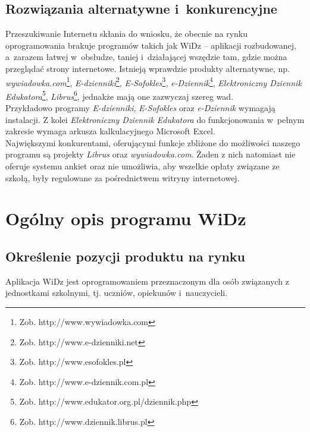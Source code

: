 \documentclass[12pt,leqno,twoside]{mwart}
\begin{document}
\subsection{Rozwiązania alternatywne i~konkurencyjne}
\noindent Przeszukiwanie Internetu skłania do wniosku, że obecnie na rynku oprogramowania brakuje programów takich jak WiDz – aplikacji rozbudowanej, a~zarazem łatwej w~obsłudze, taniej i~działającej wszędzie tam, gdzie można przeglądać strony internetowe. Istnieją wprawdzie produkty alternatywne, np. \textit{wywiadowka.com}\footnote{Zob. http://www.wywiadowka.com}, \textit{E-dzienniki}\footnote{Zob. http://www.e-dzienniki.net}, \textit{E-Sofokles}\footnote{Zob. http://www.esofokles.pl}, \textit{e-Dziennik}\footnote{Zob. http://www.e-dziennik.com.pl}, \textit{Elektroniczny Dziennik Edukatora}\footnote{Zob. http://www.edukator.org.pl/dziennik.php}, \textit{Librus}\footnote{Zob. http://www.dziennik.librus.pl}, jednakże mają one zazwyczaj szereg wad.\\
\indent Przykładowo programy \textit{E-dzienniki}, \textit{E-Sofokles} oraz \textit{e-Dziennik} wymagają instalacji. Z kolei \textit{Elektroniczny Dziennik Edukatora} do funkcjonowania w~pełnym zakresie wymaga arkusza kalkulacyjnego Microsoft Excel.\\
\indent Największymi konkurentami, oferującymi funkcje zbliżone do możliwości naszego programu są projekty \textit{Librus} oraz \textit{wywiadowka.com}. Żaden z nich natomiast nie oferuje systemu ankiet oraz nie umożliwia, aby  wszelkie opłaty związane ze szkołą, były regulowane za pośrednictwem witryny internetowej.

\section{Ogólny opis programu WiDz}
\subsection{Określenie pozycji produktu na rynku}
\noindent Aplikacja WiDz jest oprogramowaniem przeznaczonym dla osób związanych z jednostkami szkolnymi, tj. uczniów, opiekunów i~nauczycieli.
\end{document}
